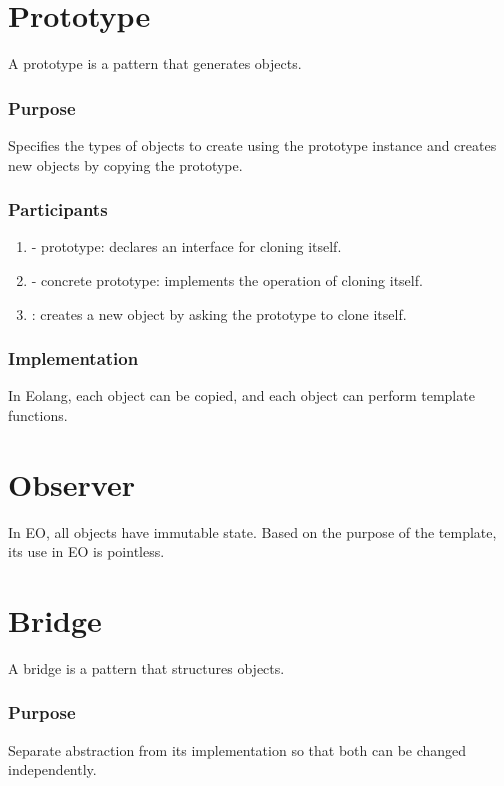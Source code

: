 \documentclass[12pt]{book}
\begin{document}
{{\begin{enumerate}
\end{enumerate}

\section{Prototype}
A prototype is a pattern that generates objects.

\subsubsection{Purpose}
Specifies the types of objects to create using the prototype instance and creates new objects by copying the prototype.

\subsubsection{Participants}
\begin{enumerate}
    \item {}- prototype: declares an interface for cloning itself.
    \item {} - concrete prototype: implements the operation of cloning itself.
    \item {}: creates a new object by asking the prototype to clone itself.
\end{enumerate}

\subsubsection{Implementation}
In Eolang, each object can be copied, and each object can perform template functions.

\section{Observer}
In EO, all objects have immutable state. Based on the purpose of the template, its use in EO is pointless.

\section{Bridge}
A bridge is a pattern that structures objects.

\subsubsection{Purpose}
Separate abstraction from its implementation so that both can be changed independently.

}}
\end{document}
